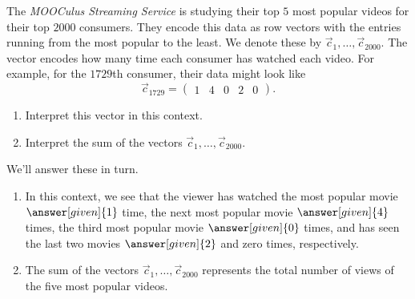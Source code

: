 \documentclass{ximera}
\begin{document}
\begin{example}
  The \textit{MOOCulus Streaming Service} is studying their top $5$
  most popular videos for their top $2000$ consumers. They encode this
  data as row vectors with the entries running from the most popular
  to the least. We denote these by $\vec c_1, \dots, \vec
  c_{2000}$. The vector encodes how many time each consumer has
  watched each video. For example, for the $1729$th consumer, their
  data might look like
  \[
  \vec c_{1729} = \begin{pmatrix} 1 & 4 & 0 &  2 & 0 \end{pmatrix}.
  \]
  \begin{enumerate}
  \item Interpret this vector in this context.
  \item Interpret the sum of the vectors $\vec{c}_1, \dots,
    \vec{c}_{2000}$.
  \end{enumerate}
  \begin{explanation}
    We'll answer these in turn.
    \begin{enumerate}
    \item In this context, we see that the viewer has watched the most
      popular movie $\answer[given]{1}$ time, the next most popular
      movie $\answer[given]{4}$ times, the third most popular movie
      $\answer[given]{0}$ times, and has seen the last two movies
      $\answer[given]{2}$ and zero times, respectively.
    \item The sum of the vectors $\vec{c}_1, \dots, \vec{c}_{2000}$
      represents the total number of views of the five most popular
      videos.
    \end{enumerate}
  \end{explanation}
\end{example}


\end{document}
